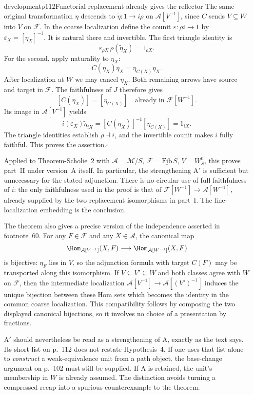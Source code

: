 \begin{dcomment}{development}{p112}{Functorial replacement already gives the reflector}
The same original transformation $\eta$ descends to $\widetilde\eta:1\to i\rho$ on $\mathcal A[V^{-1}]$, since $C$ sends $V\subseteq W$ into $V$ on $\mathcal F$. In the coarse localization define the counit $\varepsilon:\rho i\to1$ by $\varepsilon_X=[\eta_X]^{-1}$. It is natural there and invertible. The first triangle identity is
\[
\varepsilon_{\rho X}\,\rho(\widetilde\eta_X)=1_{\rho X}.
\]
For the second, apply naturality to $\eta_X$:
\[
C(\eta_X)\eta_X=\eta_{C(X)}\eta_X.
\]
After localization at $W$ we may cancel $\eta_X$. Both remaining arrows have source and target in $\mathcal F$. The faithfulness of $\bar J$ therefore gives
\[
[C(\eta_X)]=[\eta_{C(X)}]
\quad\text{already in }\mathcal F[W^{-1}].
\]
Its image in $\mathcal A[V^{-1}]$ yields
\[
i(\varepsilon_X)\widetilde\eta_{iX}
=[C(\eta_X)]^{-1}[\eta_{C(X)}]=1_{iX}.
\]
The triangle identities establish $\rho\dashv i$, and the invertible counit makes $i$ fully faithful. This proves the assertion.\hfill$\square$

Applied to Theorem-Scholie~2 with $\mathcal A=\mathcal M/S$, $\mathcal F=\underline{\mathrm{Fib}}\,S$, $V=W_S^0$, this proves part~II under version~A itself. In particular, the strengthening A$'$ is sufficient but unnecessary for the stated adjunction. There is no circular use of full faithfulness of $i$: the only faithfulness used in the proof is that of $\mathcal F[W^{-1}]\to\mathcal A[W^{-1}]$, already supplied by the two replacement isomorphisms in part~I. The fine-localization embedding is the conclusion.

The theorem also gives a precise version of the independence asserted in footnote~60. For any $F\in\mathcal F$ and any $X\in\mathcal A$, the canonical map
\[
\Hom_{\mathcal A[V^{-1}]}(X,F)\longrightarrow
\Hom_{\mathcal A[W^{-1}]}(X,F)
\]
is bijective: $\eta_F$ lies in $V$, so the adjunction formula with target $C(F)$ may be transported along this isomorphism. If $V\subseteq V'\subseteq W$ and both classes agree with $W$ on $\mathcal F$, then the intermediate localization $\mathcal A[V^{-1}]\to\mathcal A[(V')^{-1}]$ induces the unique bijection between these Hom sets which becomes the identity in the common coarse localization. This compatibility follows by composing the two displayed canonical bijections, so it involves no choice of a presentation by fractions.

A$'$ should nevertheless be read as a strengthening of A, exactly as the text says. Its short list on p.~112 does not restate Hypothesis~4. If one uses that list alone to \emph{construct} a weak-equivalence unit from a path object, the base-change argument on p.~102 must still be supplied. If A is retained, the unit's membership in $W$ is already assumed. The distinction avoids turning a compressed recap into a spurious counterexample to the theorem.
\end{dcomment}

